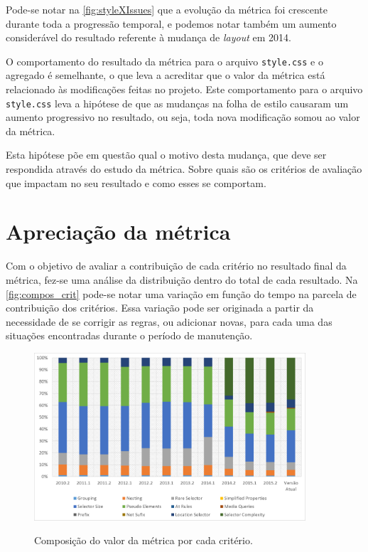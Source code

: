 Pode-se notar na \autoref{fig:styleXIssues} que a evolução da métrica foi crescente durante toda a progressão temporal, e podemos notar também um aumento considerável do resultado referente à mudança de \textit{layout} em 2014.

O comportamento do resultado da métrica para o arquivo \texttt{style.css} e o agregado é semelhante, o que leva a acreditar que o valor da métrica está relacionado às modificações feitas no projeto. Este comportamento para o arquivo \texttt{style.css} leva a hipótese de que as mudanças na folha de estilo causaram um aumento progressivo no resultado, ou seja, toda nova modificação somou ao valor da métrica.

Esta hipótese põe em questão qual o motivo desta mudança, que deve ser respondida através do estudo da métrica. Sobre quais são os critérios de avaliação que impactam no seu resultado e como esses se comportam. 

\section{Apreciação da métrica}

Com o objetivo de avaliar a contribuição de cada critério no resultado final da métrica, fez-se uma análise da distribuição dentro do total de cada resultado. Na \autoref{fig:compos_crit} pode-se notar uma variação em função do tempo na parcela de contribuição dos critérios. Essa variação pode ser originada a partir da necessidade de se corrigir as regras, ou adicionar novas, para cada uma das situações encontradas durante o período de manutenção.

\begin{figure}[!htb]
	\centering
	\caption{Composição do valor da métrica por cada critério.}
	\includegraphics[width=0.9\textwidth]{./04-figuras/composition_criteria}
	\label{fig:compos_crit}
\end{figure}

